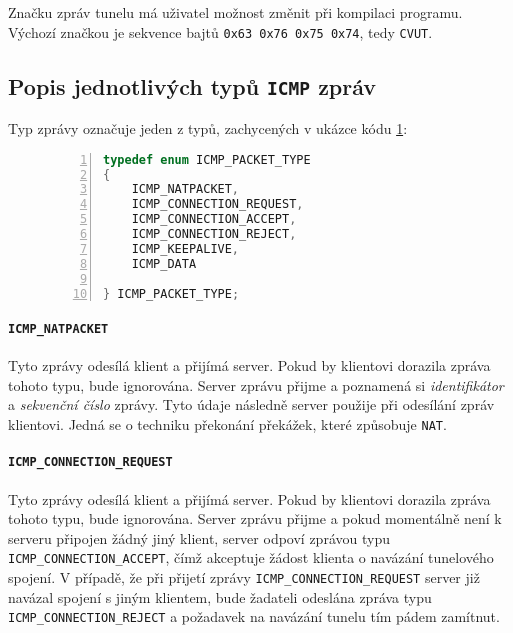 \documentclass[thesis=M,czech]{FITthesis}[2012/10/20]
\begin{document}
    Značku zpráv tunelu má uživatel možnost změnit při kompilaci programu. Výchozí značkou je sekvence bajtů \verb|0x63 0x76 0x75 0x74|, tedy \texttt{CVUT}.
    

    \vfill
    \pagebreak
    
\subsection{Popis jednotlivých typů \texttt{ICMP} zpráv}
    
    Typ zprávy označuje jeden z typů, zachycených v ukázce kódu \ref{code:icmp-types}:
    

    
    \begin{figure}[h]
	\begin{lstlisting}[caption=Výňatek souboru plugins/icmp/packet.h definující typy ICMP zpráv,language=c,frame=single,numbers=left]
typedef enum ICMP_PACKET_TYPE
{
	ICMP_NATPACKET,
	ICMP_CONNECTION_REQUEST,
	ICMP_CONNECTION_ACCEPT,
	ICMP_CONNECTION_REJECT,
	ICMP_KEEPALIVE,
	ICMP_DATA

} ICMP_PACKET_TYPE;
      \end{lstlisting}
      \label{code:icmp-types}
    \end{figure}

  \paragraph{\texttt{ICMP\_NATPACKET}}
    Tyto zprávy odesílá klient a přijímá server. Pokud by klientovi dorazila zpráva tohoto typu, bude ignorována. Server zprávu přijme a poznamená si \textit{identifikátor} a \textit{sekvenční číslo} zprávy. Tyto údaje následně server použije při odesílání zpráv klientovi. Jedná se o techniku překonání překážek, které způsobuje \texttt{NAT}.
    
  \paragraph{\texttt{ICMP\_CONNECTION\_REQUEST}}
  
    Tyto zprávy odesílá klient a přijímá server. Pokud by klientovi dorazila zpráva tohoto typu, bude ignorována. Server zprávu přijme a pokud momentálně není k serveru připojen žádný jiný klient, server odpoví zprávou typu \texttt{ICMP\_CONNECTION\_ACCEPT}, čímž akceptuje žádost klienta o navázání tunelového spojení. V případě, že při přijetí zprávy \texttt{ICMP\_CONNECTION\_REQUEST} server již navázal spojení s jiným klientem, bude žadateli odeslána zpráva typu \texttt{ICMP\_CONNECTION\_REJECT} a požadavek na navázání tunelu tím pádem zamítnut.
    
\end{document}
